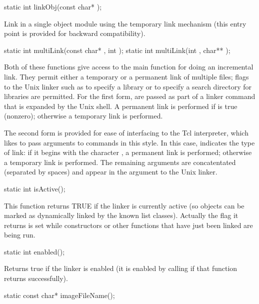 \begin{example}
static int linkObj(const char* );
\end{example}

Link in a single object module using the temporary link mechanism
(this entry point is provided for backward compatibility).

\begin{example}
static int multiLink(const char* , int );
static int multiLink(int , char** );
\end{example}

Both of these functions give access to the main function for doing
an incremental link.  They permit either a temporary or a permanent
link of multiple files; flags to the Unix linker such as 
to specify a library or  to specify a search directory for
libraries are permitted.  For the first form,  are passed
as part of a linker command that is expanded by the Unix shell.  A
permanent link is performed if  is true (nonzero);
otherwise a temporary link is performed.

The second form is provided for ease of interfacing to the Tcl
interpreter, which likes to pass arguments to commands in this
style.  In this case,  indicates the type of
link: if it begins with the character , a permanent link
is performed; otherwise a temporary link is performed.  The remaining
arguments are concatentated (separated by spaces) and appear in the
argument to the Unix linker.

\begin{example}
static int isActive();
\end{example}


This function returns TRUE if the linker is currently active (so objects
can be marked as dynamically linked by the known list classes).
Actually the flag it returns is set while constructors or other
functions that have just been linked are being run.

\begin{example}
static int enabled();
\end{example}

Returns true if the linker is enabled (it is enabled by calling
 if that function returns successfully).

\begin{example}
static const char* imageFileName();
\end{example}

